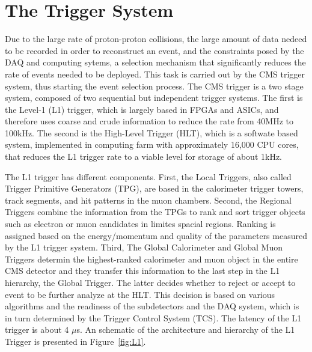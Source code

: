 \section{The Trigger System}
Due to the large rate of proton-proton collisions, the large amount
of data nedeed to be recorded in order to reconstruct an event, and the constraints posed by
the DAQ and computing sytems, a
selection mechanism that significantly reduces the rate of events
needed to be deployed. This task is carried out by the CMS trigger
system, thus starting the event selection process. The CMS trigger
is a two stage system, composed of two sequential but independent
trigger systems. The first is the Level-1 (L1) trigger, which is
largely based in FPGAs and ASICs, and therefore uses coarse and crude
information to reduce the rate from 40\unit{MHz} to 100\unit{kHz}. The
second is the High-Level Trigger (HLT), which is a softwate based
system, implemented in computing farm with approximately 16,000 CPU
cores, that reduces the L1 trigger rate to a viable level for storage
of about 1\unit{kHz}. 

The L1 trigger has different components. First, the Local Triggers, also called Trigger Primitive Generators
(TPG), are based in the calorimeter trigger towers, track segments,
and hit patterns in the muon chambers. Second, the Regional Triggers
combine the information from the TPGs to rank and sort trigger objects
such as electron or muon candidates in limites spacial
regions. Ranking is assigned based on the energy/momentum and quality
of the parameters measured by the L1 trigger system. Third, The Global
Calorimeter and Global Muon Triggers determin the highest-ranked
calorimeter and muon object in the entire CMS detector and they
transfer this information to the last step in the L1 hierarchy, the
Global Trigger. The latter decides whether to reject or accept to
event to be further analyze at the HLT. This decision is based on
various algorithms and the readiness of the subdetectors and the DAQ
system, which is in turn determined by the Trigger Control System
(TCS). The latency of the L1 trigger is about 4 $\mu$s. An schematic of the architecture and hierarchy of the L1
Trigger is presented in Figure~\ref{fig:L1}. 

